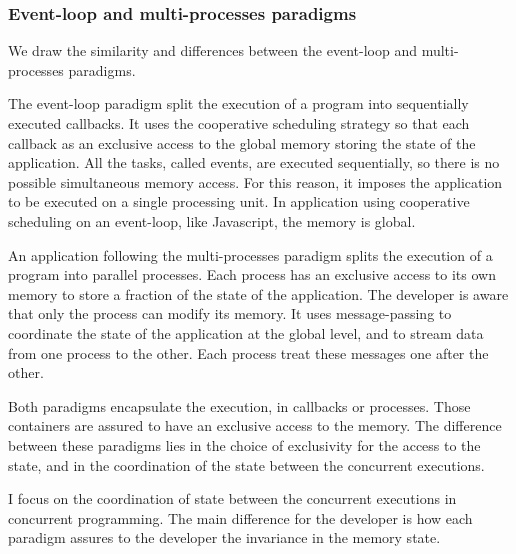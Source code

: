 \subsubsection{Event-loop and multi-processes paradigms}


We draw the similarity and differences between the event-loop and multi-processes paradigms.

The event-loop paradigm split the execution of a program into sequentially executed callbacks.
It uses the cooperative scheduling strategy so that each callback as an exclusive access to the global memory storing the state of the application.
All the tasks, called events, are executed sequentially, so there is no possible simultaneous memory access.
For this reason, it imposes the application to be executed on a single processing unit.
In application using cooperative scheduling on an event-loop, like Javascript, the memory is global.

An application following the multi-processes paradigm splits the execution of a program into parallel processes.
Each process has an exclusive access to its own memory to store a fraction of the state of the application.
The developer is aware that only the process can modify its memory.
It uses message-passing to coordinate the state of the application at the global level, and to stream data from one process to the other.
Each process treat these messages one after the other.

Both paradigms encapsulate the execution, in callbacks or processes.
Those containers are assured to have an exclusive access to the memory.
The difference between these paradigms lies in the choice of exclusivity for the access to the state, and in the coordination of the state between the concurrent executions.

I focus on the coordination of state between the concurrent executions in concurrent programming.
The main difference for the developer is how each paradigm assures to the developer the invariance in the memory state.

